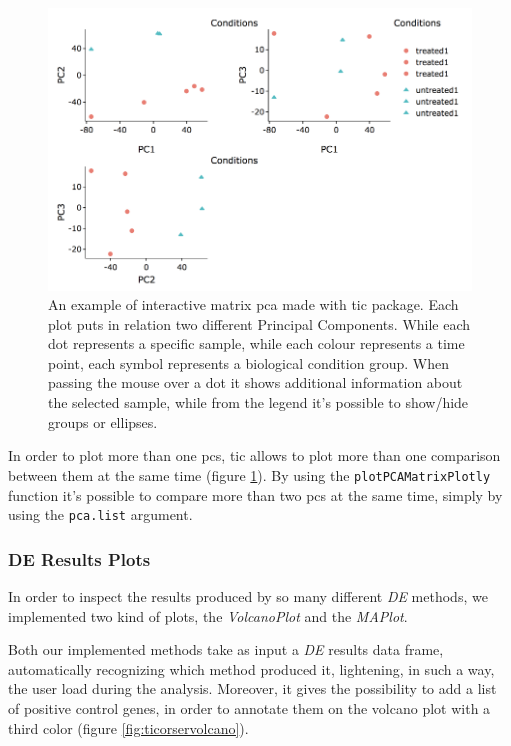 \begin{figure}[H]
\centering
\includegraphics[width=\textwidth, keepaspectratio]{img/ticorser/pcas.png}
\caption[ticorser pca]{An example of interactive matrix \gls{pca} made with \gls{tic} package. Each plot puts in relation two different Principal Components. While each dot represents a specific sample, while each colour represents a time point, each symbol represents a biological condition group. When passing the mouse over a dot it shows additional information about the selected sample, while from the legend it's possible to show/hide groups or ellipses.}
\label{fig:ticorserpcas}
\end{figure}

In order to plot more than one \glspl{pc}, \gls{tic} allows to plot more than one comparison between them at the same time (figure \ref{fig:ticorserpcas}).
By using the \lstinline!plotPCAMatrixPlotly! function it's possible to compare more than two \glspl{pc} at the same time, simply by using the \lstinline!pca.list! argument.


\subsubsection{DE Results Plots}
In order to inspect the results produced by so many different \textit{DE} methods, we implemented two kind of plots, the \textit{VolcanoPlot} and the \textit{MAPlot}.

Both our implemented methods take as input a \textit{DE} results data frame, automatically recognizing which method produced it, lightening, in such a way, the user load during the analysis.
Moreover, it gives the possibility to add a list of positive control genes, in order to annotate them on the volcano plot with a third color (figure \ref{fig:ticorservolcano}).

